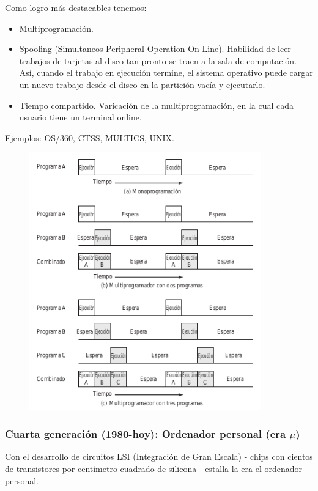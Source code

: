 \documentclass{article}
\begin{document}
Como logro más destacables tenemos:
\begin{itemize}
\item Multiprogramación.

\item Spooling (Simultaneos Peripheral Operation On Line). Habilidad de leer trabajos de tarjetas al disco tan pronto se traen a la sala de computación. Así, cuando el trabajo en ejecución termine, el sistema operativo puede cargar un nuevo trabajo desde el disco en la partición vacía y ejecutarlo.

\item Tiempo compartido. Varicación de la multiprogramación, en la cual cada usuario tiene un terminal online.
\end{itemize}

Ejemplos: OS/360, CTSS, MULTICS, UNIX.

\begin{figure}[h]
\centering
\includegraphics[scale=1, width=100mm]{multiprogramacion.png}
\end{figure}

\subsubsection{Cuarta generación (1980-hoy): Ordenador personal (era $\mu$)}
Con el desarrollo de circuitos LSI (Integración de Gran Escala) - chips con cientos de transistores por centímetro cuadrado de silicona - estalla la era el ordenador personal. 
\end{document}
